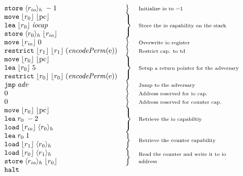 \documentclass{article}
\newcommand{\pcreg}{\mathrm{pc}}
\newcommand{\plainfun}[1]{\mathit{#1}}
\newcommand{\encodePerm}{\plainfun{encodePerm}}
\newcommand{\codelabel}[1]{\mathit{#1}}
\newcommand{\iocap}{\codelabel{iocap}}
\newcommand{\refreg}[1]{\lfloor #1 \rfloor}
\newcommand{\refheap}[1]{\langle #1 \rangle_h}
\newcommand{\halt}{\instr{halt}}
\newcommand{\instr}[1]{\mathtt{#1}}
\newcommand{\oneinstr}[2]{\instr{#1} \; #2}
\newcommand{\jmp}[1]{\oneinstr{jmp}{#1}}
\newcommand{\twoinstr}[3]{\instr{#1} \; #2 \; #3}
\newcommand{\move}[2]{\twoinstr{move}{#1}{#2}}
\newcommand{\store}[2]{\twoinstr{store}{#1}{#2}}
\newcommand{\load}[2]{\twoinstr{load}{#1}{#2}}
\newcommand{\lea}[2]{\twoinstr{lea}{#1}{#2}}
\newcommand{\threeinstr}[4]{\instr{#1} \; #2 \; #3 \; #4}
\newcommand{\restrict}[3]{\threeinstr{restrict}{#1}{#2}{#3}}
\newcommand{\plainperm}[1]{\mathrm{#1}}
\newcommand{\entry}{\plainperm{e}}
\begin{document}
\[\begin{array}{r l l p{\mrlen}}
           & \store{\refheap{\rio}}{-1} & \bracket{1} & \annotate{1}{Initialize io to $-1$} \\
           & \move{\refreg{r_0}}{\refreg{\pcreg}} & \bracket{3} & \annotate{3}{Store the io capability on the stack} \\
           & \lea{\refreg{r_0}}{\iocap} & & \\
           & \store{\refheap{r_0}}{\refreg{\rio}} & & \\
           & \move{\refreg{\rio}}{0} & \bracket{1} & \annotate{1}{Overwrite io register} \\
           & \restrict{\refreg{r_1}}{\refreg{r_1}}{(\encodePerm{(\entry)})} &\bracket{1} & \annotate{1}{Restrict cap. to td} \\
           & \move{\refreg{r_0}}{\refreg{\pcreg}} & \bracket{3} & \annotate{3}{Setup a return pointer for the adversary} \\
           & \lea{\refreg{r_0}}{5} & & \\
           & \restrict{\refreg{r_0}}{\refreg{r_0}}{(\encodePerm{(\entry)})} & & \\
           & \jmp{\codelabel{adv}} & \bracket{1} & \annotate{1}{Jump to the adversary} \\
           & 0 & \bracket{1} & \annotate{1}{Address reserved for io cap.} \\
           & 0 & \bracket{1} & \annotate{1}{Address reserved for counter cap.} \\
           & \move{\refreg{r_0}}{\refreg{\pcreg}} & \bracket{3} & \annotate{3}{Retrieve the io capabiltiy} \\
           & \lea{r_0}{-2} & & \\
           & \load{\refreg{\rio}}{\refheap{r_0}} & & \\
           & \lea{r_0}{1} & \bracket{2} & \annotate{2}{Retrieve the counter capability} \\
           & \load{\refreg{r_1}}{\refheap{r_0}} & & \\
           & \load{\refreg{r_0}}{\refheap{r_1}} & \bracket{2} & \annotate{2}{Read the counter and write it to io address} \\
           & \store{\refheap{\rio}}{\refreg{r_0}} & & \\
           & \halt
  \end{array}
\]
\end{document}
